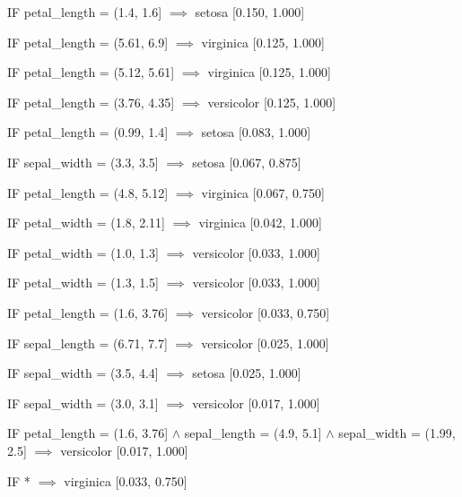 IF petal_length = (1.4, 1.6] $\implies$ setosa [0.150, 1.000]

IF petal_length = (5.61, 6.9] $\implies$ virginica [0.125, 1.000]

IF petal_length = (5.12, 5.61] $\implies$ virginica [0.125, 1.000]

IF petal_length = (3.76, 4.35] $\implies$ versicolor [0.125, 1.000]

IF petal_length = (0.99, 1.4] $\implies$ setosa [0.083, 1.000]

IF sepal_width = (3.3, 3.5] $\implies$ setosa [0.067, 0.875]

IF petal_length = (4.8, 5.12] $\implies$ virginica [0.067, 0.750]

IF petal_width = (1.8, 2.11] $\implies$ virginica [0.042, 1.000]

IF petal_width = (1.0, 1.3] $\implies$ versicolor [0.033, 1.000]

IF petal_width = (1.3, 1.5] $\implies$ versicolor [0.033, 1.000]

IF petal_length = (1.6, 3.76] $\implies$ versicolor [0.033, 0.750]

IF sepal_length = (6.71, 7.7] $\implies$ versicolor [0.025, 1.000]

IF sepal_width = (3.5, 4.4] $\implies$ setosa [0.025, 1.000]

IF sepal_width = (3.0, 3.1] $\implies$ versicolor [0.017, 1.000]

IF petal_length = (1.6, 3.76] $\land$ sepal_length = (4.9, 5.1] $\land$ sepal_width = (1.99, 2.5] $\implies$ versicolor [0.017, 1.000]

IF * $\implies$ virginica [0.033, 0.750]

